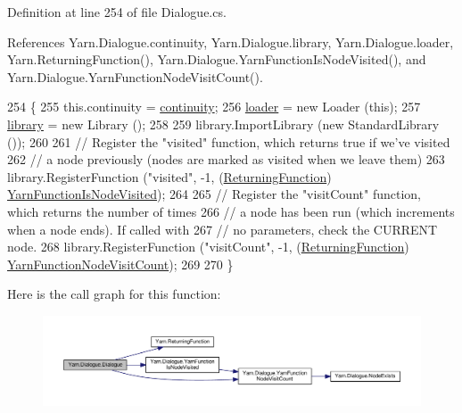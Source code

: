 Definition at line 254 of file Dialogue.\-cs.



References Yarn.\-Dialogue.\-continuity, Yarn.\-Dialogue.\-library, Yarn.\-Dialogue.\-loader, Yarn.\-Returning\-Function(), Yarn.\-Dialogue.\-Yarn\-Function\-Is\-Node\-Visited(), and Yarn.\-Dialogue.\-Yarn\-Function\-Node\-Visit\-Count().


\begin{DoxyCode}
254                                                          \{
255             this.continuity = \hyperlink{a00094_ae94eaa4b03b432422f5d205fabe37ff5}{continuity};
256             \hyperlink{a00094_a98bbe0ac2ccadeeeb7e05e3e6e19f2e0}{loader} = \textcolor{keyword}{new} Loader (\textcolor{keyword}{this});
257             \hyperlink{a00094_ae660d4cfb6e296358d2f61d8ee74c66a}{library} = \textcolor{keyword}{new} Library ();
258 
259             library.ImportLibrary (\textcolor{keyword}{new} StandardLibrary ());
260 
261             \textcolor{comment}{// Register the "visited" function, which returns true if we've visited}
262             \textcolor{comment}{// a node previously (nodes are marked as visited when we leave them)}
263             library.RegisterFunction (\textcolor{stringliteral}{"visited"}, -1, (\hyperlink{a00053_a5177bf74fbfe7303fac9d8236c2e514b}{ReturningFunction})
      \hyperlink{a00094_a1ab129bd84381928531d503304ca08d6}{YarnFunctionIsNodeVisited});
264 
265             \textcolor{comment}{// Register the "visitCount" function, which returns the number of times}
266             \textcolor{comment}{// a node has been run (which increments when a node ends). If called with}
267             \textcolor{comment}{// no parameters, check the CURRENT node.}
268             library.RegisterFunction (\textcolor{stringliteral}{"visitCount"}, -1, (\hyperlink{a00053_a5177bf74fbfe7303fac9d8236c2e514b}{ReturningFunction})
      \hyperlink{a00094_a10c9f22d3f55e74f091cd6069c431094}{YarnFunctionNodeVisitCount});
269 
270         \}
\end{DoxyCode}


Here is the call graph for this function\-:
\nopagebreak
\begin{figure}[H]
\begin{center}
\leavevmode
\includegraphics[width=350pt]{a00094_a349debf4c4b8d48e3d80ff31ad380b0e_cgraph}
\end{center}
\end{figure}




